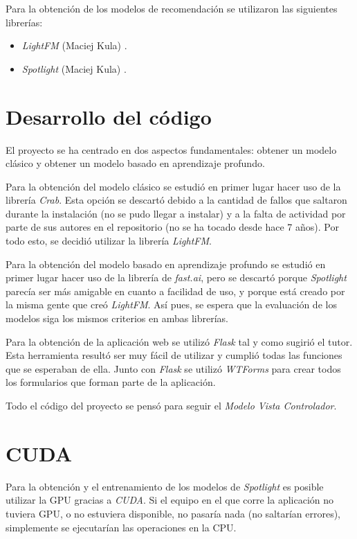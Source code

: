 Para la obtención de los modelos de recomendación se utilizaron las siguientes librerías:
\begin{itemize}
\tightlist
\item
	\emph{LightFM} (Maciej Kula) \cite{kulalightfm}.
\item
	\emph{Spotlight} (Maciej Kula) \cite{kula2017spotlight}.
\end{itemize}

\section{Desarrollo del código}\label{desarrollo-codigo}
El proyecto se ha centrado en dos aspectos fundamentales: obtener un modelo clásico y obtener un modelo basado en aprendizaje profundo.

Para la obtención del modelo clásico se estudió en primer lugar hacer uso de la librería \textit{Crab}. Esta opción se descartó debido a la cantidad de fallos que saltaron durante la instalación (no se pudo llegar a instalar) y a la falta de actividad por parte de sus autores en el repositorio (no se ha tocado desde hace 7 años). Por todo esto, se decidió utilizar la librería \textit{LightFM}.

Para la obtención del modelo basado en aprendizaje profundo se estudió en primer lugar hacer uso de la librería de \textit{fast.ai}, pero se descartó porque \textit{Spotlight} parecía ser más amigable en cuanto a facilidad de uso, y porque está creado por la misma gente que creó \textit{LightFM}. Así pues, se espera que la evaluación de los modelos siga los mismos criterios en ambas librerías.

Para la obtención de la aplicación web se utilizó \textit{Flask} tal y como sugirió el tutor. Esta herramienta resultó ser muy fácil de utilizar y cumplió todas las funciones que se esperaban de ella. Junto con \textit{Flask} se utilizó \textit{WTForms} para crear todos los formularios que forman parte de la aplicación.

Todo el código del proyecto se pensó para seguir el \textit{Modelo Vista Controlador}.

\section{CUDA}\label{cuda}
Para la obtención y el entrenamiento de los modelos de \textit{Spotlight} es posible utilizar la GPU gracias a \textit{CUDA}. Si el equipo en el que corre la aplicación no tuviera GPU, o no estuviera disponible, no pasaría nada (no saltarían errores), simplemente se ejecutarían las operaciones en la CPU.

